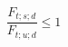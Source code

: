 \documentclass[12pt]{article}
\begin{document}
\begin{displaymath}
\frac {F_{t;s;d}} {F_{t;u;d}} \leq 1
\end{displaymath}
\end{document}
